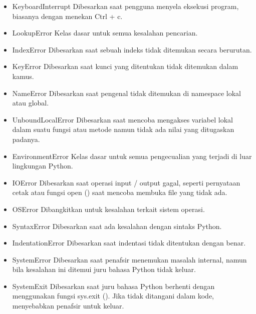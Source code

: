 \begin{enumerate}
\begin{itemize}
        \item KeyboardInterrupt
        Dibesarkan saat pengguna menyela eksekusi program, biasanya dengan menekan Ctrl + c.

        \item LookupError
        Kelas dasar untuk semua kesalahan pencarian.

        \item IndexError
        Dibesarkan saat sebuah indeks tidak ditemukan secara berurutan.

        \item KeyError
        Dibesarkan saat kunci yang ditentukan tidak ditemukan dalam kamus.

        \item NameError
        Dibesarkan saat pengenal tidak ditemukan di namespace lokal atau global.

        \item UnboundLocalError
        Dibesarkan saat mencoba mengakses variabel lokal dalam suatu fungsi atau metode namun tidak ada nilai yang ditugaskan padanya.

        \item EnvironmentError
        Kelas dasar untuk semua pengecualian yang terjadi di luar lingkungan Python.

        \item IOError
        Dibesarkan saat operasi input / output gagal, seperti pernyataan cetak atau fungsi open () saat mencoba membuka file yang tidak ada.

        \item OSError
        Dibangkitkan untuk kesalahan terkait sistem operasi.

        \item SyntaxError
        Dibesarkan saat ada kesalahan dengan sintaks Python.

        \item IndentationError
        Dibesarkan saat indentasi tidak ditentukan dengan benar.

        \item SystemError
        Dibesarkan saat penafsir menemukan masalah internal, namun bila kesalahan ini ditemui juru bahasa Python tidak keluar.

        \item SystemExit
        Dibesarkan saat juru bahasa Python berhenti dengan menggunakan fungsi sys.exit (). Jika tidak ditangani dalam kode, menyebabkan penafsir untuk keluar.


\end{itemize}
\end{enumerate}
